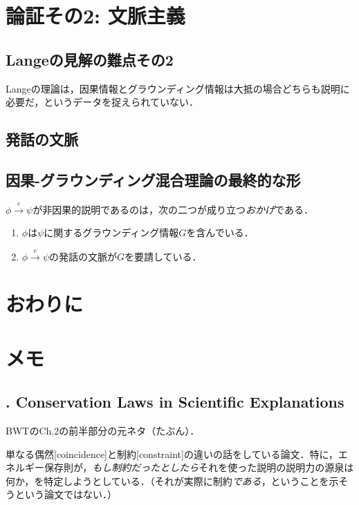 \documentclass[twoside,12pt,uplatex]{jsarticle}
\theoremstyle{definition}
\begin{document}
\section{論証その2: 文脈主義}\label{secondargument}

\subsection{Langeの見解の難点その2}
Langeの理論は，因果情報とグラウンディング情報は大抵の場合どちらも説明に必要だ，というデータを捉えられていない．

\subsection{発話の文脈}

\subsection{因果-グラウンディング混合理論の最終的な形}
$\phi\xrightarrow{e}\psi$が非因果的説明であるのは，次の二つが成り立つ\emph{おかげ}である．
	\begin{enumerate}
	\item $\phi$は$\psi$に関するグラウンディング情報$G$を含んでいる．	
	\item $\phi\xrightarrow{e}\psi$の発話の文脈が$G$を要請している．
	\end{enumerate}

\section{おわりに}

\section{メモ}
\cite{Lange2009a,Lange2009b,Lange2010,Lange2011,Lange2012,Lange2013a,Lange2013b,Lange2013c,Lange2014,Lange2015,Lange2016,Lange2018a,Lange2018b}

\subsection{\cite{Lange2011}. Conservation Laws in Scientific Explanations}
BWTのCh.2の前半部分の元ネタ（たぶん）．

単なる偶然[coincidence]と制約[constraint]の違いの話をしている論文．特に，エネルギー保存則が，\emph{もし制約だったとしたら}それを使った説明の説明力の源泉は何か，を特定しようとしている．（それが実際に制約\emph{である}，ということを示そうという論文ではない．）
\end{document}
